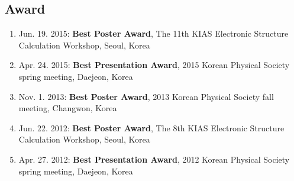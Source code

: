 \subsection{Award}\label{award}

\begin{enumerate}
\def\labelenumi{\arabic{enumi}.}
\tightlist
\item
  Jun. 19. 2015: \textbf{Best Poster Award}, The 11th KIAS Electronic
  Structure Calculation Workshop, Seoul, Korea
\item
  Apr. 24. 2015: \textbf{Best Presentation Award}, 2015 Korean Physical
  Society spring meeting, Daejeon, Korea
\item
  Nov. 1. 2013: \textbf{Best Poster Award}, 2013 Korean Physical Society
  fall meeting, Changwon, Korea
\item
  Jun. 22. 2012: \textbf{Best Poster Award}, The 8th KIAS Electronic
  Structure Calculation Workshop, Seoul, Korea
\item
  Apr. 27. 2012: \textbf{Best Presentation Award}, 2012 Korean Physical
  Society spring meeting, Daejeon, Korea
\end{enumerate}
